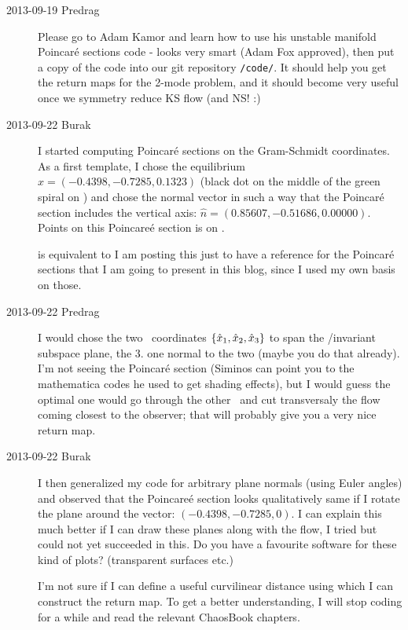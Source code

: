 \begin{description}
\item[2013-09-19 Predrag]
Please go to Adam Kamor and learn how to use his
unstable manifold Poincar\'e sections code - looks very smart (Adam
Fox approved), then put a copy of the code into our git  repository
\texttt{/code/}. It should help you get the return maps for the
2-mode problem, and it should become very useful once we symmetry
reduce KS flow (and NS! :)

\item[2013-09-22 Burak]
I started computing Poincar\'e sections on the Gram-Schmidt coordinates.
As a first template, I chose the equilibrium $\hat{x} = (-0.4398, -0.7285, 0.1323)$
(black dot on the middle of the green spiral on )
and chose the normal vector in such a way that the Poincar\'e section includes
 the vertical axis: $\hat{n} =  (0.85607, -0.51686, 0.00000)$. Points on this
 Poincare\'e section is on .

 is equivalent to
 	I am posting this just to
have a reference for the Poincar\'e sections that I am going 	to
present in this blog, since I used my own basis on those.


\item[2013-09-22 Predrag]
I would chose the two \reducedsp\ coordinates
$\{\hat{x}_1,\hat{x}_2,\hat{x}_3\}$ to span the \chartBord/invariant
subspace plane, the 3. one normal to the two (maybe you do that already).
I'm not seeing the Poincar\'e section (Siminos can point you to the
mathematica codes he used to get shading effects), but I would guess
the optimal one would go through the other \reqv\ and cut transversaly
the flow coming closest to the observer; that will probably give you
a very nice return map.

\item[2013-09-22 Burak]
 I then generalized my code for
 arbitrary plane normals (using Euler angles) and observed that the Poincare\'e
 section looks qualitatively same if I rotate the plane around  the vector:
 $(-0.4398, -0.7285, 0)$. I can explain this much better if I can draw these planes
 along with the flow, I tried but could not yet succeeded in this. Do you have a favourite
 software for these kind of plots? (transparent surfaces etc.)

 I'm not sure
 if I can define a useful curvilinear distance using which I can construct the return map.
 To get a better understanding, I will stop coding for a while and read
 the relevant ChaosBook chapters.



\end{description}
